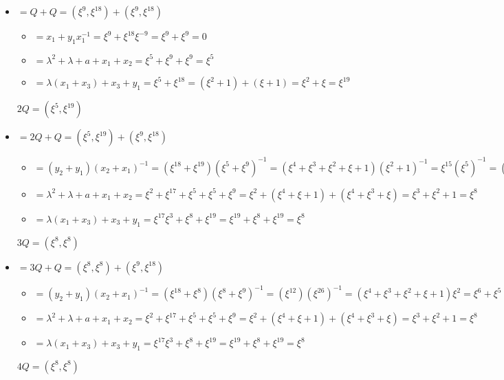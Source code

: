 \documentclass[fleqn]{article}
\begin{document}
    \begin{itemize}
        \item[$2Q$] $ = Q + Q = (\xi^9, \xi^{18}) + (\xi^9, \xi^{18})$
                    \begin{itemize}
                        \item[$\lambda$] $ = x_1 + y_1 x_1^{-1} = \xi^9 + \xi^{18} \xi^{-9} = \xi^9 + \xi^9 = 0$
                        \item[$x_3$] $ = \lambda^2 + \lambda + a + x_1 + x_2 = \xi^5 + \xi^9 + \xi^{9} = \xi^{5}$
                        \item[$y_3$] $ = \lambda(x_1 + x_3) + x_3 + y_1 = \xi^{5} + \xi^{18} = (\xi^2 + 1) + (\xi + 1) = \xi^2 + \xi = \xi^{19}$
                    \end{itemize}
                    $2Q = (\xi^{5}, \xi^{19})$
        \item[$3Q$] $ = 2Q + Q = (\xi^{5}, \xi^{19}) + (\xi^9, \xi^{18})$
                    \begin{itemize}
                        \item[$\lambda$] $ = (y_2 + y_1)(x_2 + x_1)^{-1} = (\xi^{18} + \xi^{19})(\xi^{5} + \xi^{9})^{-1} = (\xi^4 + \xi^3 + \xi^2 + \xi + 1)(\xi^2 + 1)^{-1} = \xi^{15} (\xi^{5})^{-1} = 
                                            (\xi^4 + \xi^3 + \xi^2 + \xi + 1) \xi^{2} = \xi^6 + \xi^5 + \xi^4 + \xi^3 + \xi^2 = \xi^4 + \xi + 1 = \xi^{17}$
                        \item[$x_3$] $ = \lambda^2 + \lambda + a + x_1 + x_2 = \xi^{2} + \xi^{17} + \xi^{5} + \xi^{5} + \xi^{9} = \xi^2 + (\xi^4 + \xi + 1) + (\xi^4 + \xi^3 + \xi) = \xi^3 + \xi^2 + 1 = \xi^8$
                        \item[$y_3$] $ = \lambda(x_1 + x_3) + x_3 + y_1 = \xi^{17}\xi^3 + \xi^8 + \xi^{19} = \xi^{19} + \xi^8 + \xi^{19} = \xi^8$
                    \end{itemize}
                    $3Q = (\xi^{8}, \xi^{8})$
        \item[$4Q$] $ = 3Q + Q = (\xi^{8}, \xi^{8}) + (\xi^9, \xi^{18})$
                    \begin{itemize}
                        \item[$\lambda$] $ = (y_2 + y_1)(x_2 + x_1)^{-1} = (\xi^{18} + \xi^{8})(\xi^{8} + \xi^{9})^{-1} = (\xi^{12})(\xi^{26})^{-1} = 
                                            (\xi^4 + \xi^3 + \xi^2 + \xi + 1) \xi^{2} = \xi^6 + \xi^5 + \xi^4 + \xi^3 + \xi^2 = \xi^4 + \xi + 1 = \xi^{17}$
                        \item[$x_3$] $ = \lambda^2 + \lambda + a + x_1 + x_2 = \xi^{2} + \xi^{17} + \xi^{5} + \xi^{5} + \xi^{9} = \xi^2 + (\xi^4 + \xi + 1) + (\xi^4 + \xi^3 + \xi) = \xi^3 + \xi^2 + 1 = \xi^8$
                        \item[$y_3$] $ = \lambda(x_1 + x_3) + x_3 + y_1 = \xi^{17}\xi^3 + \xi^8 + \xi^{19} = \xi^{19} + \xi^8 + \xi^{19} = \xi^8$
                    \end{itemize}
                    $4Q = (\xi^{8}, \xi^{8})$
    \end{itemize}
\end{document}
